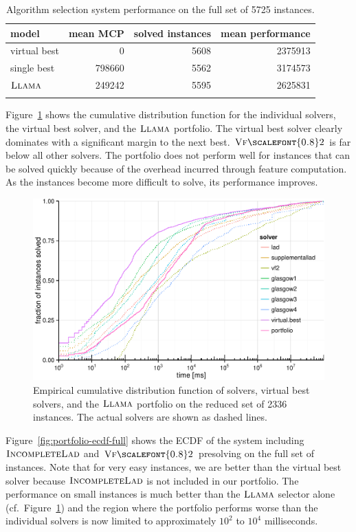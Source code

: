 \documentclass{llncs}
\newcommand{\VFtwo}{$\textsc{Vf{\scalefont{0.8}2}}$\xspace}
\newcommand{\IncompleteLAD}{$\textsc{IncompleteLad}$\xspace}
\newcommand{\LLAMA}{$\textsc{Llama}$\xspace}
\begin{document}
\begin{table}[ht]
    \centering\setlength{\tabcolsep}{1em}
\begin{tabular}{lrrr}
  \toprule
model & mean MCP & solved instances & mean performance\\
  \midrule
virtual best & 0 & 5608 & 2375913\\
single best & 798660 & 5562 & 3174573\\
\LLAMA & 249242 & 5595 & 2625831\\
   \bottomrule \\
\end{tabular}
\caption{Algorithm selection system performance on the full set of 5725
instances.}\label{tab:resfull}
\end{table}

Figure~\ref{fig:portfolio-ecdf} shows the cumulative distribution function for
the individual solvers, the virtual best solver, and the \LLAMA portfolio. The
virtual best solver clearly dominates with a significant margin to the next
best. \VFtwo is far below all other solvers. The portfolio does not perform well
for instances that can be solved quickly because of the overhead incurred
through feature computation. As the instances become more difficult to solve,
its performance improves.

\begin{figure}[!ht]
\includegraphics[width=\textwidth]{figures/portfolio-ecdf}
\caption{Empirical cumulative distribution function of solvers, virtual best
solvers, and the \LLAMA portfolio on the reduced set of 2336 instances. The
actual solvers are shown as dashed lines.}
\label{fig:portfolio-ecdf}
\end{figure}

Figure~\ref{fig:portfolio-ecdf-full} shows the ECDF of the system including
\IncompleteLAD and \VFtwo presolving on the full set of instances. Note that for
very easy instances, we are better than the virtual best solver because
\IncompleteLAD is not included in our portfolio. The performance on small
instances is much better than the \LLAMA selector alone (cf.\
Figure~\ref{fig:portfolio-ecdf}) and the region where the portfolio performs
worse than the individual solvers is now limited to approximately $10^2$ to
$10^4$ milliseconds.
\end{document}

